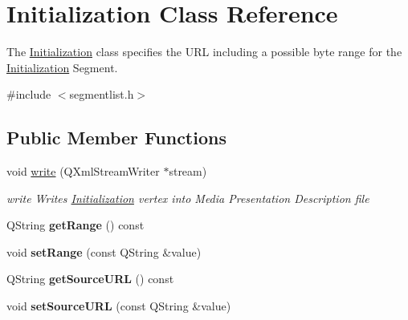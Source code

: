 \hypertarget{class_initialization}{\section{Initialization Class Reference}
\label{class_initialization}
}


The \hyperlink{class_initialization}{Initialization} class specifies the U\-R\-L including a possible byte range for the \hyperlink{class_initialization}{Initialization} Segment.  




{\ttfamily \#include $<$segmentlist.\-h$>$}

\subsection*{Public Member Functions}
\begin{DoxyCompactItemize}
\item 
void \hyperlink{class_initialization_adbcec26db9b9b33a9b370875e656a93c}{write} (Q\-Xml\-Stream\-Writer $\ast$stream)
\begin{DoxyCompactList}\small\item\em write Writes \hyperlink{class_initialization}{Initialization} vertex into Media Presentation Description file \end{DoxyCompactList}\item 
\hypertarget{class_initialization_acb7cef5e5fd3b5c8efa67ec28097469f}{Q\-String {\bfseries get\-Range} () const }\label{class_initialization_acb7cef5e5fd3b5c8efa67ec28097469f}

\item 
\hypertarget{class_initialization_a82064f6832cf34a835ffef527d445c29}{void {\bfseries set\-Range} (const Q\-String \&value)}\label{class_initialization_a82064f6832cf34a835ffef527d445c29}

\item 
\hypertarget{class_initialization_a00fa04548517a51d0313a05250a12dab}{Q\-String {\bfseries get\-Source\-U\-R\-L} () const }\label{class_initialization_a00fa04548517a51d0313a05250a12dab}

\item 
\hypertarget{class_initialization_a82a2cf2f57099460d76de18bf3b9b6fe}{void {\bfseries set\-Source\-U\-R\-L} (const Q\-String \&value)}\label{class_initialization_a82a2cf2f57099460d76de18bf3b9b6fe}

\end{DoxyCompactItemize}



